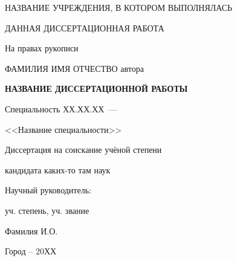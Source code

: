 \thispagestyle{empty}

\begin{center}
НАЗВАНИЕ УЧРЕЖДЕНИЯ, В КОТОРОМ ВЫПОЛНЯЛАСЬ\par
ДАННАЯ ДИССЕРТАЦИОННАЯ РАБОТА\par 
\par
\end{center}

\vspace{20mm}
\begin{flushright}
На правах рукописи

\end{flushright}

\vspace{30mm}
\begin{center}
{\large ФАМИЛИЯ ИМЯ ОТЧЕСТВО автора}
\end{center}

\vspace{5mm}
\begin{center}
{\bf \large НАЗВАНИЕ ДИССЕРТАЦИОННОЙ РАБОТЫ
\par}

\vspace{10mm}
{%
Специальность ХХ.ХХ.ХХ~---

<<Название специальности>>
}

\vspace{10mm}
Диссертация на соискание учёной степени

кандидата каких-то там наук
\end{center}

\vspace{20mm}
\begin{flushright}
Научный руководитель:

уч. степень, уч. звание

Фамилия И.О.

% 
% 

\end{flushright}

\vspace{20mm}
\begin{center}
{Город -- 20ХХ}
\end{center}

\newpage
